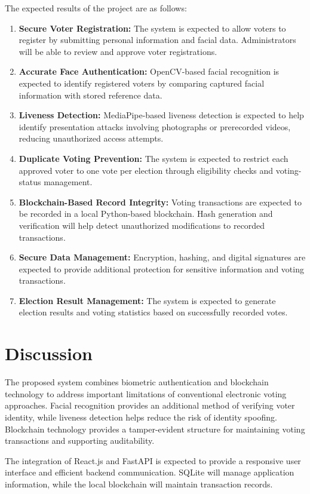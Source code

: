 \documentclass[12pt]{report}
\begin{document}
	The expected results of the project are as follows:
	\begin{enumerate}
		\item \textbf{Secure Voter Registration:} The system is expected to allow voters to register by submitting personal information and facial data. Administrators will be able to review and approve voter registrations.
		\item \textbf{Accurate Face Authentication:} OpenCV-based facial recognition is expected to identify registered voters by comparing captured facial information with stored reference data.
		\item \textbf{Liveness Detection:} MediaPipe-based liveness detection is expected to help identify presentation attacks involving photographs or prerecorded videos, reducing unauthorized access attempts.
		\item \textbf{Duplicate Voting Prevention:} The system is expected to restrict each approved voter to one vote per election through eligibility checks and voting-status management.
		\item \textbf{Blockchain-Based Record Integrity:} Voting transactions are expected to be recorded in a local Python-based blockchain. Hash generation and verification will help detect unauthorized modifications to recorded transactions.
		\item \textbf{Secure Data Management:} Encryption, hashing, and digital signatures are expected to provide additional protection for sensitive information and voting transactions.
		\item \textbf{Election Result Management:} The system is expected to generate election results and voting statistics based on successfully recorded votes.
	\end{enumerate}
	
	\section{Discussion}
	The proposed system combines biometric authentication and blockchain technology to address important limitations of conventional electronic voting approaches. Facial recognition provides an additional method of verifying voter identity, while liveness detection helps reduce the risk of identity spoofing. Blockchain technology provides a tamper-evident structure for maintaining voting transactions and supporting auditability.
	
	The integration of React.js and FastAPI is expected to provide a responsive user interface and efficient backend communication. SQLite will manage application information, while the local blockchain will maintain transaction records.
	
\end{document}
